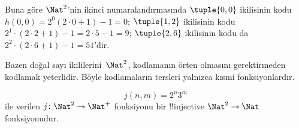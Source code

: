 \begin{explain}
Buna göre $\Nat^2$'nin ikinci numaralandırmasında $\tuple{0,0}$ ikilisinin
kodu $h(0,0)=2^0(2\cdot0+1)-1=0$; $\tuple{1,2}$ ikilisinin kodu
$2^{1}\cdot(2\cdot2+1)-1=2\cdot5-1=9$; $\tuple{2,6}$ ikilisinin kodu da
$2^{2}\cdot(2\cdot6+1)-1=51$'dir.
\end{explain}

Bazen doğal sayı ikililerini~$\Nat^2$, kodlamanın örten olmasını
gerektirmeden kodlamak yeterlidir. Böyle kodlamaların tersleri yalnızca
kısmi fonksiyonlardır.

\begin{ex}
\[
j(n,m) = 2^n3^m
\]
ile verilen $j\colon \Nat^2\to\Nat^+$ fonksiyonu bir !!{injective}
$\Nat^2\to\Nat$ fonksiyonudur.
\end{ex}

